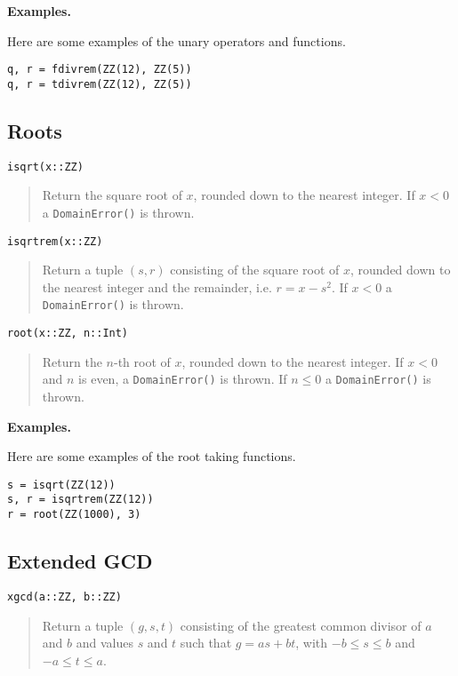 \documentclass[a4paper,10pt]{article}
\newcommand{\code}{\lstinline}
\newcommand{\desc}[1]{\vspace{-3mm}\begin{quote}#1\end{quote}}
\begin{document}
{{{{{{\textbf{Examples.}

Here are some examples of the unary operators and functions.

\begin{lstlisting}
q, r = fdivrem(ZZ(12), ZZ(5))
q, r = tdivrem(ZZ(12), ZZ(5))
\end{lstlisting}

\subsection{Roots}

\begin{lstlisting}
isqrt(x::ZZ)
\end{lstlisting}

\desc{Return the square root of $x$, rounded down to the nearest integer. If $x < 0$
a \code{DomainError()} is thrown.}

\begin{lstlisting}
isqrtrem(x::ZZ)
\end{lstlisting}

\desc{Return a tuple $(s, r)$ consisting of the square root of $x$, rounded down to the 
nearest integer and the remainder, i.e. $r = x - s^2$. If $x < 0$ a \code{DomainError()}
is thrown.}

\begin{lstlisting}
root(x::ZZ, n::Int)
\end{lstlisting}

\desc{Return the $n$-th root of $x$, rounded down to the nearest integer. If $x < 0$ and
$n$ is even, a \code{DomainError()} is thrown. If $n \leq 0$ a \code{DomainError()} is
thrown.}

\textbf{Examples.}

Here are some examples of the root taking functions.

\begin{lstlisting}
s = isqrt(ZZ(12))
s, r = isqrtrem(ZZ(12))
r = root(ZZ(1000), 3)
\end{lstlisting}

\subsection{Extended GCD}

\begin{lstlisting}
xgcd(a::ZZ, b::ZZ)
\end{lstlisting}

\desc{Return a tuple $(g, s, t)$ consisting of the greatest common divisor of $a$ and $b$
and values $s$ and $t$ such that $g = as + bt$, with $-b \leq s \leq b$ and 
$-a \leq t \leq a$.}

}}}}}}
\end{document}
